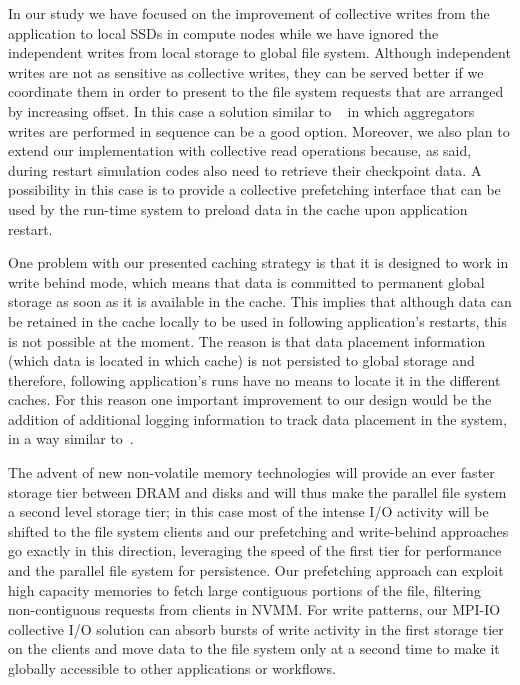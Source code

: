 In our study we have focused on the improvement of collective writes from the application to local SSDs in compute nodes while we have ignored the independent writes from local 
storage to global file system. Although independent writes are not as sensitive as collective writes, they can be served better if we coordinate them in order to present to the file system 
requests that are arranged by increasing offset. In this case a solution similar to ~\cite{Zhang2009} in which aggregators writes are performed in sequence can be a good option. 
Moreover, we also plan to extend our implementation with collective read operations because, as said, during restart simulation codes also need to retrieve their checkpoint data.
A possibility in this case is to provide a collective prefetching interface that can be used by the run-time system to preload data in the cache upon application restart.

One problem with our presented caching strategy is that it is designed to work in write behind mode, which means that data is committed to permanent global storage as soon as it is available
in the cache. This implies that although data can be retained in the cache locally to be used in following application's restarts, this is not possible at the moment. The reason is that data
placement information (which data is located in which cache) is not persisted to global storage and therefore, following application's runs have no means to locate it in the different caches.
For this reason one important improvement to our design would be the addition of additional logging information to track data placement in the system, in a way similar to~\cite{Freche2009}.

The advent of new non-volatile memory technologies will provide an ever faster storage tier between DRAM and disks and will thus make the parallel file system a second level storage
tier; in this case most of the intense I/O activity will be shifted to the file system clients and our prefetching and write-behind approaches go exactly in this direction, leveraging 
the speed of the first tier for performance and the parallel file system for persistence. Our prefetching approach can exploit high capacity memories to fetch large contiguous
portions of the file, filtering non-contiguous requests from clients in NVMM. For write patterns, our MPI-IO collective I/O solution can absorb bursts of write activity in the first storage 
tier on the clients and move data to the file system only at a second time to make it globally accessible to other applications or workflows.
